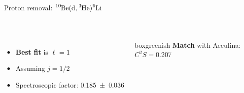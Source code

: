\documentclass[sans,
frameno, %
mp,
usenames,dvipsnames, %
onlytextwidth, %
t,%
11pt]{beamer}
\newcommand{\iso}[2]{\ce{^{#1}#2}}
\begin{document}
\begin{frame}{Proton removal: $\iso{10}{Be}(\textrm{d}, \iso{3}{He})\iso{9}{Li}$}
{\begin{columns}[t]
{\begin{figure}
                \end{figure}
            }
        \end{columns}
        \medskip
        \begin{columns}[c]
            {
                \begin{itemize}
                    \item \textbf{Best fit} is $\ell = 1$
                    \item Assuming $j = 1/2$
                    \item Spectroscopic factor: \num{0.185(36)}
                \end{itemize}
            }\hfill
            {
                \begin{beamercolorbox}[sep=1ex, center, rounded=true]{boxgreenish}
                    \textbf{Match} with Acculina: \\
                    $C^{2}S = \num{0.207}$
                \end{beamercolorbox}
            }
        \end{columns}
    }
\end{frame}
\end{document}
